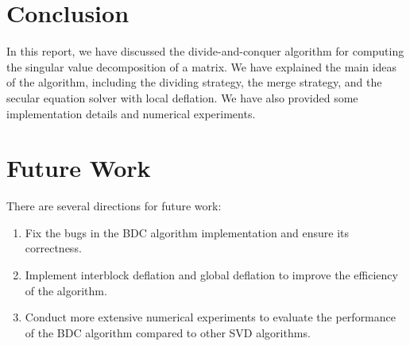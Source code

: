 \documentclass[12pt]{article}
\begin{document}
\section{Conclusion}

In this report, we have discussed the divide-and-conquer algorithm for computing the singular value decomposition of a matrix. We have explained the main ideas of the algorithm, including the dividing strategy, the merge strategy, and the secular equation solver with local deflation. We have also provided some implementation details and numerical experiments.

\section{Future Work}

There are several directions for future work:
\begin{enumerate}
    \item Fix the bugs in the BDC algorithm implementation and ensure its correctness.
    \item Implement interblock deflation and global deflation to improve the efficiency of the algorithm.
    \item Conduct more extensive numerical experiments to evaluate the performance of the BDC algorithm compared to other SVD algorithms.
\end{enumerate}
\end{document}
